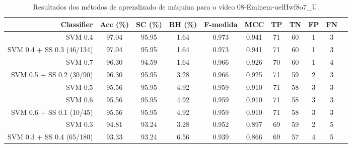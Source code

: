 \begin{table}[!htb]
\centering
\caption{Resultados dos métodos de aprendizado de máquina para o vídeo 08-Eminem-uelHwf8o7_U.}
\label{tab:08-Eminem-uelHwf8o7_U}
\begin{tabular}{r|c|c|c|c|c|c|c|c|c|c}
\hline\hline
Classifier & Acc (\%) & SC (\%) & BH (\%) & F-medida & MCC & TP & TN & FP & FN \\ \hline
SVM 0.4 & 97.04 & 95.95 & 1.64 & 0.973 & 0.941 & 71 & 60 & 1 & 3 \\ 
SVM 0.4 + SS 0.3 (46/134) & 97.04 & 95.95 & 1.64 & 0.973 & 0.941 & 71 & 60 & 1 & 3 \\ 
SVM 0.7 & 96.30 & 94.59 & 1.64 & 0.966 & 0.926 & 70 & 60 & 1 & 4 \\ 
SVM 0.5 + SS 0.2 (30/90) & 96.30 & 95.95 & 3.28 & 0.966 & 0.925 & 71 & 59 & 2 & 3 \\ 
SVM 0.5 & 95.56 & 95.95 & 4.92 & 0.959 & 0.910 & 71 & 58 & 3 & 3 \\ 
SVM 0.6 & 95.56 & 95.95 & 4.92 & 0.959 & 0.910 & 71 & 58 & 3 & 3 \\ 
SVM 0.6 + SS 0.1 (10/45) & 95.56 & 95.95 & 4.92 & 0.959 & 0.910 & 71 & 58 & 3 & 3 \\ 
SVM 0.3 & 94.81 & 93.24 & 3.28 & 0.952 & 0.897 & 69 & 59 & 2 & 5 \\ 
SVM 0.3 + SS 0.4 (65/180) & 93.33 & 93.24 & 6.56 & 0.939 & 0.866 & 69 & 57 & 4 & 5 \\ 
\hline\hline
\end{tabular}
\end{table}
